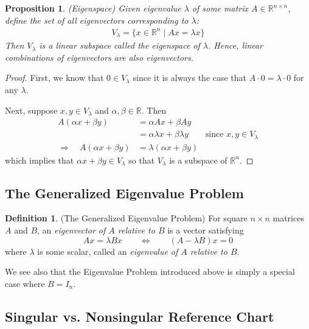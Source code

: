 \documentclass[12pt]{article}
\numberwithin{equation}{section} %
\theoremstyle{plain}
\newtheorem{prop}[thm]{Proposition}
\theoremstyle{definition}
\newtheorem{defn}[thm]{Definition}
\theoremstyle{remark}
\newcommand{\R}{\mathbb{R}}
\newcommand{\Rn}{\mathbb{R}^n}
\newcommand{\Rnn}{\mathbb{R}^{n\times n}}
\begin{document}
\begin{prop}{\emph{(Eigenspace)}}
Given eigenvalue $\lambda$ of some matrix $A\in\Rnn$, define the set of
all eigenvectors corresponding to $\lambda$:
\begin{align*}
  V_\lambda = \{ x\in \Rn \; | \; Ax = \lambda x \}
\end{align*}
Then $V_\lambda$ is a linear subspace called the \emph{eigenspace of
$\lambda$}. Hence, linear combinations of eigenvectors are also
eigenvectors.
\end{prop}
\begin{proof}
First, we know that $0\in V_\lambda$ since it is always the case that
$A\cdot 0=\lambda \cdot 0$ for any $\lambda$.

Next, suppose $x,y \in V_\lambda$ and $\alpha,\beta\in\R$. Then
\begin{align*}
  A(\alpha x + \beta y)
  &= \alpha Ax + \beta Ay \\
  &= \alpha \lambda x + \beta \lambda y
  \qquad \text{since $x,y\in V_\lambda$} \\
  \Rightarrow\quad
  A(\alpha x + \beta y)
  &= \lambda (\alpha x + \beta y)
\end{align*}
which implies that $\alpha x + \beta y \in V_\lambda$ so that
$V_\lambda$ is a subspace of $\Rn$.
\end{proof}


\subsection{The Generalized Eigenvalue Problem}

\begin{defn}{(The Generalized Eigenvalue Problem)}
For square $n\times n$ matrices $A$ and $B$, an \emph{eigenvector of
$A$ relative to $B$} is a vector satisfying
\begin{equation}
  Ax = \lambda B x
  \qquad \Leftrightarrow \qquad
  (A - \lambda B) x = 0
\end{equation}
where $\lambda$ is some scalar, called an \emph{eigenvalue of $A$
relative to $B$}.

We see also that the Eigenvalue Problem introduced above is simply a
special case where $B=I_n$.
\end{defn}

\subsection{Singular vs. Nonsingular Reference Chart}
\end{document}
